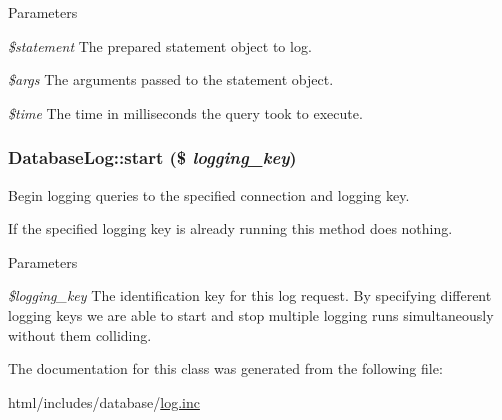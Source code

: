 \begin{DoxyParams}{Parameters}
\item[{\em \$statement}]The prepared statement object to log. \item[{\em \$args}]The arguments passed to the statement object. \item[{\em \$time}]The time in milliseconds the query took to execute. \end{DoxyParams}
\hypertarget{classDatabaseLog_a9e563dc89a838deefce998de656f4631}{
\subsubsection[{start}]{\setlength{\rightskip}{0pt plus 5cm}DatabaseLog::start (\$ {\em logging\_\-key})}}
\label{classDatabaseLog_a9e563dc89a838deefce998de656f4631}
Begin logging queries to the specified connection and logging key.

If the specified logging key is already running this method does nothing.


\begin{DoxyParams}{Parameters}
\item[{\em \$logging\_\-key}]The identification key for this log request. By specifying different logging keys we are able to start and stop multiple logging runs simultaneously without them colliding. \end{DoxyParams}


The documentation for this class was generated from the following file:\begin{DoxyCompactItemize}
\item 
html/includes/database/\hyperlink{log_8inc}{log.inc}\end{DoxyCompactItemize}
